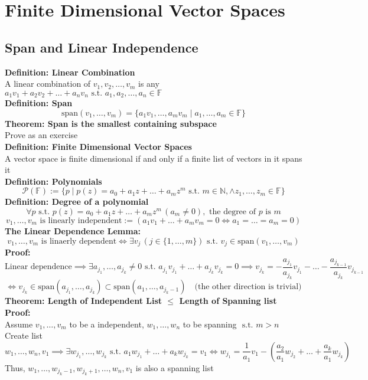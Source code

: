 \documentclass{article}
\newcommand{\N}{\mathbb{N}}
\newcommand{\F}{\mathbb{F}}
\newcommand{\st}{\mbox{ s.t. }}
\newcommand{\0}{{\bf{0}}}
\newcommand{\spa}{\mbox{span}}
\begin{document}
\section{Finite Dimensional Vector Spaces}
\subsection{Span and Linear Independence}
\textbf{Definition: Linear Combination}\\
A linear combination of $v_1,v_2,\dots,v_m$ is any $a_1v_1+a_2v_2+\dots+a_nv_n\st a_1,a_2,\dots,a_n\in\mathbb{F}$\\
\textbf{Definition: Span}
$$\spa(v_1,\dots,v_m)=\{a_1v_1,\dots,a_mv_m\mid a_1,\dots,a_m\in\F\}$$
\textbf{Theorem: Span is the smallest containing subspace}\\
\null\hfill{Prove as an exercise}\\
\textbf{Definition: Finite Dimensional Vector Spaces}\\
A vector space is finite dimensional if and only if a finite list of vectors in it spans it\\
\textbf{Definition: Polynomials}
$$\mathcal{P}(\F):=\{p\mid p(z)=a_0+a_1z+\dots+a_mz^m\st m\in\N,\land z_1,\dots,z_m\in\F\}$$
\textbf{Definition: Degree of a polynomial}
$$\forall p\st p(z)=a_0+a_1z+\dots+a_mz^m\,(a_m\neq0),\mbox{ the degree of }p\mbox{ is }m$$
$$v_1,\dots,v_m\mbox{ is linearly independent}:=(a_1v_1+\dots+a_mv_m=0\iff a_1=\dots=a_m=0)$$
\textbf{The Linear Dependence Lemma:}
$$v_1,\dots,v_m\mbox{ is linaerly dependent}\iff\exists v_j\,(j\in\{1,\dots,m\})\st v_j\in\spa(v_1,\dots,v_m)$$
\textbf{Proof:}\
$$\mbox{Linear dependence}\implies\exists  a_{j_1},\dots,a_{j_k}\neq0\st a_{j_1}v_{j_1}+\dots+a_{j_k}v_{j_k}=0\implies v_{j_k}=-\frac{a_{j_1}}{a_{j_k}}v_{j_1}-\dots-\frac{a_{j_{k-1}}}{a_{j_k}}v_{j_{k-1}}$$
$$\iff v_{j_k}\in\spa(a_{j_1},\dots,a_{j_k})\subset\spa(a_1,\dots,a_{j_k-1})\quad\mbox{(the other direction is trivial)}$$
\textbf{Theorem: Length of Independent List $\le$ Length of Spanning list}\\
\textbf{Proof:}\\
Assume $v_1,\dots,v_m$ to be a independent, $w_1,\dots,w_n$ to be spanning $\st m>n$\\
Create list $w_1,\dots,w_n,v_1\implies\exists w_{j_1},\dots,w_{j_k}\st a_1w_{j_1}+\dots+a_kw_{j_k}=v_1\iff w_{j_1}=\dfrac{1}{a_1}v_1-(\dfrac{a_2}{a_1}w_{j_2}+\dots+\dfrac{a_k}{a_1}w_{j_k})$\\
Thus, $w_1,\dots,w_{j_k-1},w_{j_k+1},\dots,w_n,v_1$ is also a spanning list
\end{document}
